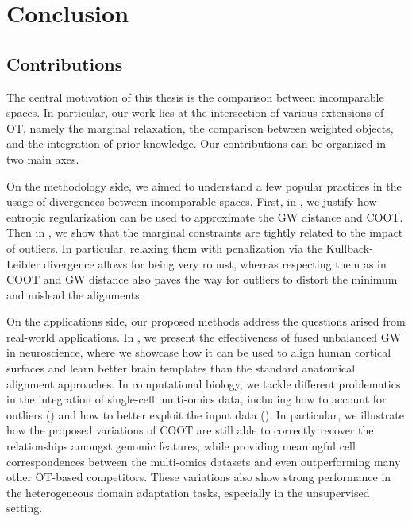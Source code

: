 \chapter[Conclusion]{Conclusion}


\renewcommand{\contentsname}{Contents}
\localtableofcontents*
{}

\section{Contributions}

The central motivation of this thesis is the comparison between incomparable spaces.
In particular, our work lies at the intersection of various extensions of OT,
namely the marginal relaxation, the comparison between weighted objects,
and the integration of prior knowledge. Our contributions can be organized in two main axes.

On the methodology side, we aimed to understand a few popular practices in the usage of
divergences between incomparable spaces. First, in ,
we justify how entropic regularization can be used to approximate the GW distance and COOT.
Then in ,
we show that the marginal constraints are tightly related to the impact of outliers. In particular,
relaxing them with penalization via the Kullback-Leibler divergence allows for being very robust,
whereas respecting them as in COOT and GW distance also paves the way for outliers to distort the
minimum and mislead the alignments.

On the applications side, our proposed methods address the questions arised from real-world
applications. In , we present the effectiveness of fused unbalanced GW in neuroscience,
where we showcase how it can be used to align human cortical surfaces and
learn better brain templates than the standard anatomical alignment approaches.
In computational biology, we tackle different problematics in the integration of
single-cell multi-omics data, including how to account for outliers ()
and how to better exploit the input data ().
In particular, we illustrate how the proposed variations of COOT are still able to correctly recover
the relationships amongst genomic features, while providing meaningful
cell correspondences between the multi-omics datasets and even outperforming
many other OT-based competitors. These variations also show strong performance in the
heterogeneous domain adaptation tasks, especially in the unsupervised setting.


